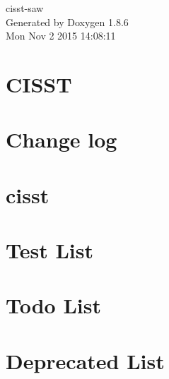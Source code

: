 \documentclass[twoside]{book}
\newcommand{\clearemptydoublepage}{%
  \newpage{\pagestyle{empty}\cleardoublepage}%
}
\begin{document}
\hypersetup{pageanchor=false}
\begin{titlepage}
\vspace*{7cm}
\begin{center}%
{\Large cisst-\/saw }\\
\vspace*{1cm}
{\large Generated by Doxygen 1.8.6}\\
\vspace*{0.5cm}
{\small Mon Nov 2 2015 14:08:11}\\
\end{center}
\end{titlepage}
\clearemptydoublepage
\tableofcontents
\clearemptydoublepage
{}
\hypersetup{pageanchor=true}

\chapter{C\-I\-S\-S\-T}
\label{index}\hypertarget{index}{}
\chapter{Change log}
\label{d6/d6b/md__home_adeguet1_catkin_ws_src_cisst-saw_cisst__c_h_a_n_g_e_l_o_g}
\hypertarget{d6/d6b/md__home_adeguet1_catkin_ws_src_cisst-saw_cisst__c_h_a_n_g_e_l_o_g}{}

\chapter{cisst}
\label{dc/dbf/md__home_adeguet1_catkin_ws_src_cisst-saw_cisst__r_e_a_d_m_e}
\hypertarget{dc/dbf/md__home_adeguet1_catkin_ws_src_cisst-saw_cisst__r_e_a_d_m_e}{}

\chapter{Test List}
\label{d4/df6/test}
\hypertarget{d4/df6/test}{}

\chapter{Todo List}
\label{dd/da0/todo}
\hypertarget{dd/da0/todo}{}

\chapter{Deprecated List}
\label{da/d58/deprecated}
\hypertarget{da/d58/deprecated}{}

\end{document}
